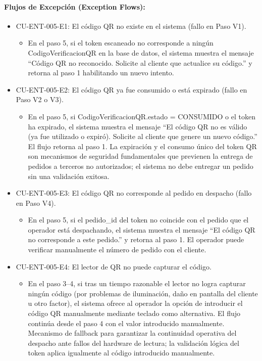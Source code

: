 \paragraph{Flujos de Excepción (Exception Flows):}
\begin{itemize}
    \item CU-ENT-005-E1: El código QR no existe en el sistema (fallo en Paso V1).
    \begin{itemize}
        \item En el paso 5, si el token escaneado no corresponde a ningún CodigoVerificacionQR en la base de datos, el sistema muestra el mensaje ``Código QR no reconocido. Solicite al cliente que actualice su código.'' y retorna al paso 1 habilitando un nuevo intento.
    \end{itemize}
    \item CU-ENT-005-E2: El código QR ya fue consumido o está expirado (fallo en Paso V2 o V3).
    \begin{itemize}
        \item En el paso 5, si CodigoVerificacionQR.estado = CONSUMIDO o el token ha expirado, el sistema muestra el mensaje ``El código QR no es válido (ya fue utilizado o expiró). Solicite al cliente que genere un nuevo código.'' El flujo retorna al paso 1. La expiración y el consumo único del token QR son mecanismos de seguridad fundamentales que previenen la entrega de pedidos a terceros no autorizados; el sistema no debe entregar un pedido sin una validación exitosa.
    \end{itemize}
    \item CU-ENT-005-E3: El código QR no corresponde al pedido en despacho (fallo en Paso V4).
    \begin{itemize}
        \item En el paso 5, si el pedido\_id del token no coincide con el pedido que el operador está despachando, el sistema muestra el mensaje ``El código QR no corresponde a este pedido.'' y retorna al paso 1. El operador puede verificar manualmente el número de pedido con el cliente.
    \end{itemize}
    \item CU-ENT-005-E4: El lector de QR no puede capturar el código.
    \begin{itemize}
        \item En el paso 3--4, si tras un tiempo razonable el lector no logra capturar ningún código (por problemas de iluminación, daño en pantalla del cliente u otro factor), el sistema ofrece al operador la opción de introducir el código QR manualmente mediante teclado como alternativa. El flujo continúa desde el paso 4 con el valor introducido manualmente. Mecanismo de fallback para garantizar la continuidad operativa del despacho ante fallos del hardware de lectura; la validación lógica del token aplica igualmente al código introducido manualmente.

\end{itemize}
\end{itemize}
